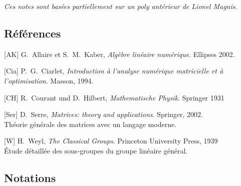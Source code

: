 {\small\sl Ces notes sont basées partiellement sur un poly antérieur de Lionel
Magnis.}

\subsection{Références}

[AK]
G.~Allaire et S.~M.~Kaber,
\emph{Algèbre linéaire numérique}.
Ellipses 2002.


[Cia]
P.~G.~Ciarlet,
\emph{Introduction à l'analyse numérique matricielle et à
l'optimisation}.
Masson, 1994.

[CH]
R.~Courant und D.~Hilbert,
\emph{Mathematische Physik}.
Springer 1931

[Ser]
D.~Serre,
\emph{Matrices: theory and applications}.
Springer, 2002.\\
Théorie générale des matrices avec un langage moderne.


[W]
H.~Weyl,
\emph{The Classical Groups}.
Princeton University Press, 1939\\
Étude détaillée des sous-groupes du groupe linéaire général.

\clearpage
\subsection{Notations}

